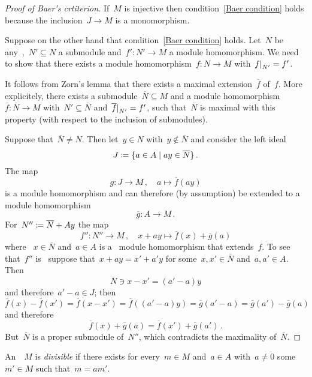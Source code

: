 \begin{proof}[Proof of Baer’s crtiterion]
  If~$M$ is injective then condition~\ref*{Baer condition} holds because the inclusion~$J \to M$ is a monomorphism.
  
  Suppose on the other hand that condition~\ref*{Baer condition} holds.
  Let~$N$ be any~{},~$N' \subseteq N$ a submodule and~$f' \colon N' \to M$ a module homomorphism.
  We need to show that there exists a module homomorphism~$f \colon N \to M$ with~$\restrict{f}{N'} = f'$.
  
  It follows from Zorn’s lemma that there exists a maximal extension~$\overline{f}$ of~$f$.
  More explicitely, there exists a submodule~$\overline{N} \subseteq M$ and a module homomorphism~$\overline{f} \colon \overline{N} \to M$ with~$N' \subseteq \overline{N}$ and~$\restrict{\overline{f}}{N'} = f'$, such that~$\overline{N}$ is maximal with this property (with respect to the inclusion of submodules).
  
  Suppose that~$\overline{N} \neq N$.
  Then let~$y \in N$ with~$y \notin \overline{N}$ and consider the left ideal
  \[
    J
    \defined
    \{
      a \in A
    \suchthat
      a y \in \overline{N}
    \}  \,.
  \]
  The map
  \[
    g
    \colon
    J
    \to
    M \,,
    \quad
    a
    \mapsto
    \overline{f}(a y)
  \]
  is a module homomorphism and can therefore (by assumption) be extended to a module homomorphism
  \[
    \overline{g}
    \colon
    A
    \to
    M \,.
  \]
  For~$N'' \coloneqq \overline{N} + A y$ the map
  \[
    f''
    \colon
    N''
    \to
    M \,,
    \quad
    x + a y
    \mapsto
    \overline{f}(x) + \overline{g}(a)
  \]
  where ~$x \in \overline{N}$ and~$a \in A$ is a~{\welldef} module homomorphism that extends~$f$.
  To see that~$f''$ is~{\welldef} suppose that~$x + ay = x' + a'y$ for some~$x, x' \in \overline{N}$ and~$a, a' \in A$.
  Then
  \[
    \overline{N}
    \ni
    x - x'
    =
    (a' - a)y
  \]
  and therefore~$a' - a \in J$;
  then
  \[
      \overline{f}(x) - \overline{f}(x')
    =
    \overline{f}(x - x')
    =
    \overline{f}( (a' - a) y )
    =
    \overline{g}(a' - a)
    =
    \overline{g}(a') - \overline{g}(a)
  \]
  and therefore
  \[
    \overline{f}(x) + \overline{g}(a)
    =
    \overline{f}(x') + \overline{g}(a') \,.
  \]
  But~$\overline{N}$ is a proper submodule of~$N''$, which contradicts the maximality of~$\overline{N}$.
\end{proof}


\begin{definition*}
  An~{}~$M$ is \emph{divisible} if there exists for every~$m \in M$ and~$a \in A$ with~$a \neq 0$ some~$m' \in M$ such that~$m = a m'$.
\end{definition*}


